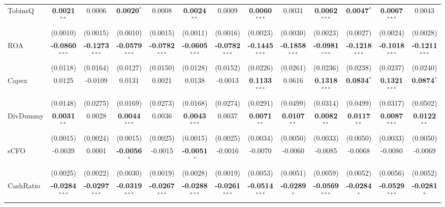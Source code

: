 \begin{landscape}
\begin{table}[H]
\begin{tabular}{lcccccccccccc}
TobinsQ & \textbf{0.0021}$^{**}$ & 0.0006 & \textbf{0.0020}$^{*}$ & 0.0008 & \textbf{0.0024}$^{**}$ & 0.0009 & \textbf{0.0060}$^{***}$ & 0.0031 & \textbf{0.0062}$^{***}$ & \textbf{0.0047}$^{*}$ & \textbf{0.0067}$^{***}$ & 0.0043 \\
 & (0.0010) & (0.0015) & (0.0010) & (0.0015) & (0.0011) & (0.0016) & (0.0023) & (0.0030) & (0.0023) & (0.0027) & (0.0024) & (0.0028) \\
ROA & \textbf{-0.0860}$^{***}$ & \textbf{-0.1273}$^{***}$ & \textbf{-0.0579}$^{***}$ & \textbf{-0.0782}$^{***}$ & \textbf{-0.0605}$^{***}$ & \textbf{-0.0782}$^{***}$ & \textbf{-0.1445}$^{***}$ & \textbf{-0.1858}$^{***}$ & \textbf{-0.0981}$^{***}$ & \textbf{-0.1218}$^{***}$ & \textbf{-0.1018}$^{***}$ & \textbf{-0.1211}$^{***}$ \\
 & (0.0118) & (0.0164) & (0.0127) & (0.0150) & (0.0128) & (0.0152) & (0.0226) & (0.0261) & (0.0236) & (0.0238) & (0.0237) & (0.0240) \\
Capex & 0.0125 & -0.0109 & 0.0131 & 0.0021 & 0.0138 & -0.0013 & \textbf{0.1133}$^{***}$ & 0.0616 & \textbf{0.1318}$^{***}$ & \textbf{0.0834}$^{*}$ & \textbf{0.1321}$^{***}$ & \textbf{0.0874}$^{*}$ \\
 & (0.0148) & (0.0275) & (0.0169) & (0.0273) & (0.0168) & (0.0274) & (0.0291) & (0.0499) & (0.0314) & (0.0499) & (0.0317) & (0.0502) \\
DivDummy & \textbf{0.0031}$^{**}$ & 0.0028 & \textbf{0.0044}$^{***}$ & 0.0036 & \textbf{0.0043}$^{***}$ & 0.0037 & \textbf{0.0071}$^{**}$ & \textbf{0.0107}$^{**}$ & \textbf{0.0082}$^{**}$ & \textbf{0.0117}$^{**}$ & \textbf{0.0087}$^{***}$ & \textbf{0.0122}$^{**}$ \\
 & (0.0015) & (0.0024) & (0.0015) & (0.0025) & (0.0015) & (0.0025) & (0.0034) & (0.0050) & (0.0033) & (0.0050) & (0.0033) & (0.0050) \\
sCFO & -0.0039 & 0.0001 & \textbf{-0.0056}$^{*}$ & -0.0015 & \textbf{-0.0051}$^{*}$ & -0.0016 & -0.0070 & -0.0060 & -0.0085 & -0.0068 & -0.0080 & -0.0069 \\
 & (0.0025) & (0.0022) & (0.0030) & (0.0019) & (0.0028) & (0.0019) & (0.0053) & (0.0051) & (0.0059) & (0.0052) & (0.0056) & (0.0052) \\
CashRatio & \textbf{-0.0284}$^{***}$ & \textbf{-0.0297}$^{***}$ & \textbf{-0.0319}$^{***}$ & \textbf{-0.0267}$^{***}$ & \textbf{-0.0288}$^{***}$ & \textbf{-0.0261}$^{***}$ & \textbf{-0.0514}$^{***}$ & \textbf{-0.0289}$^{*}$ & \textbf{-0.0569}$^{***}$ & \textbf{-0.0284}$^{*}$ & \textbf{-0.0529}$^{***}$ & \textbf{-0.0281}$^{*}$ \\

\end{tabular}
\end{table}
\end{landscape}
